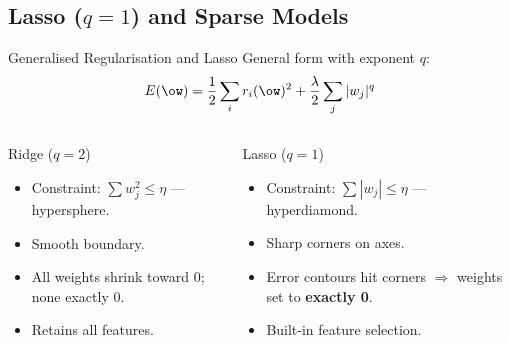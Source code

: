 \subsection{Lasso ($q=1$) and Sparse Models}

\begin{frame}{Generalised Regularisation and Lasso}
  General form with exponent $q$:
  \[
    E(\ow) = \frac{1}{2}\sum_i r_i(\ow)^2 + \frac{\lambda}{2}\sum_j |w_j|^q
  \]
  \begin{columns}[T]
  \begin{block}{Ridge ($q=2$)}
    \begin{itemize}
      \item Constraint: $\sum w_j^2\leq\eta$ — \alert{hypersphere}.
      \item Smooth boundary.
      \item All weights shrink toward 0; none exactly 0.
      \item Retains all features.
    \end{itemize}
  \end{block}
  \begin{block}{Lasso ($q=1$)}
    \begin{itemize}
      \item Constraint: $\sum|w_j|\leq\eta$ — \alert{hyperdiamond}.
      \item Sharp corners on axes.
      \item Error contours hit corners $\Rightarrow$ weights set to \textbf{exactly 0}.
      \item Built-in \alert{feature selection}.
    \end{itemize}
  \end{block}
  \end{columns}
\end{frame}

